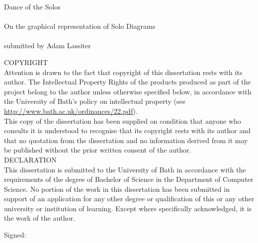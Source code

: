 \vspace{\fill}
\begin{center}
    \LARGE Dance of the Solos \\~\\
    \Large On the graphical representation of Solo Diagrams \\~\\
    \normalsize submitted by Adam Lassiter
\end{center}
\vspace{\fill}
\large COPYRIGHT \\
\normalsize Attention  is  drawn  to  the  fact  that  copyright  of  this  dissertation  rests  with  its author.
The Intellectual Property Rights of the products produced as part of the project belong to the author unless otherwise specified below, in accordance with the University of Bath’s policy on intellectual property (see \url{http://www.bath.ac.uk/ordinances/22.pdf}). \\
This  copy  of  the  dissertation  has  been  supplied  on  condition  that  anyone  who consults it is understood to recognise that its copyright rests with its author and that no quotation from the dissertation and no information derived from it may be published without the prior written consent of the author.
\vspace{\fill} \\
\large DECLARATION \\
\normalsize This dissertation is submitted to the University of Bath in accordance with the requirements of the degree of Bachelor of Science in the Department of Computer Science.
No portion of the work in this dissertation has been submitted in support of an application for any other degree or qualification of this or any other university or institution of learning.
Except where specifically acknowledged, it is the work of the author. \\
\par
Signed:
\vspace{\fill}
